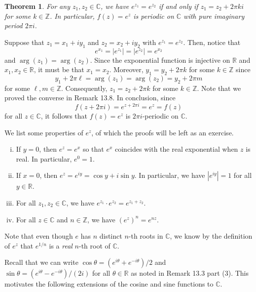 \documentclass[10pt]{article}
\makeatletter
\newcommand{\R}{\mathbb{R}}
\newcommand{\C}{\mathbb{C}}
\newcommand{\Z}{\mathbb{Z}}
\theoremstyle{newstyle}
\newtheorem{thm}{Theorem}[section]
\newenvironment{pf}[1][\proofname]{\par
  \pushQED{\qed}%
  \normalfont \topsep0\p@\relax
  \trivlist
  \item[\hskip\labelsep\scshape
  #1\@addpunct{.}]\ignorespaces
}{%
  \popQED\endtrivlist\@endpefalse
}
\makeatother
\begin{document}
\begin{thm}
For any $z_1, z_2 \in \C$, we have $e^{z_1} = e^{z_2}$ if and only if $z_1 = z_2 + 2\pi ki$ for some 
$k \in \Z$. In particular, $f(z) = e^z$ is periodic on $\C$ with pure imaginary period $2\pi i$. 
\end{thm}
\begin{pf}
Suppose that $z_1 = x_1 + iy_1$ and $z_2 = x_2 + iy_2$ with $e^{z_1} = e^{z_2}$. Then, notice that 
\[ e^{x_1} = |e^{z_1}| = |e^{z_2}| = e^{x_2} \] 
and $\arg(z_1) = \arg(z_2)$. Since the exponential function is injective on $\R$ and 
$x_1, x_2 \in \R$, it must be that $x_1 = x_2$. Moreover, $y_1 = y_2 + 2\pi k$ for some 
$k \in \Z$ since 
\[ y_1 + 2\pi\ell = \arg(z_1) = \arg(z_2) = y_2 + 2\pi m \]
for some $\ell, m \in \Z$. Consequently, $z_1 = z_2 + 2\pi k$ for some $k \in \Z$. 
Note that we proved the converse in Remark 13.8. In conclusion, since 
\[ f(z + 2\pi i) = e^{z + 2\pi i} = e^z = f(z) \]
for all $z \in \C$, it follows that $f(z) = e^z$ is $2\pi i$-periodic on $\C$. 
\end{pf}

We list some properties of $e^z$, of which the proofs will be left as an exercise. 
\begin{enumerate}[(i)]
    \item If $y = 0$, then $e^z = e^x$ so that $e^x$ coincides with the real exponential 
    when $z$ is real. In particular, $e^0 = 1$.
    \item If $x = 0$, then $e^z = e^{iy} = \cos y + i\sin y$. In particular, we have 
    $|e^{iy}| = 1$ for all $y \in \R$. 
    \item For all $z_1, z_2 \in \C$, we have $e^{z_1} \cdot e^{z_2} = e^{z_1 + z_2}$.
    \item For all $z \in \C$ and $n \in \Z$, we have $(e^z)^n = e^{nz}$. 
\end{enumerate}

Note that even though $e$ has $n$ distinct $n$-th roots in $\C$, we know by the definition of 
$e^z$ that $e^{1/n}$ is a {\it real} $n$-th root of $\C$. 

Recall that we can write $\cos\theta = (e^{i\theta} + e^{-i\theta})/2$ and $\sin\theta 
= (e^{i\theta} - e^{-i\theta})/(2i)$ for all $\theta \in \R$ as noted in Remark 13.3 
part (3). This motivates the following extensions of the cosine and sine functions to $\C$. 
\end{document}
